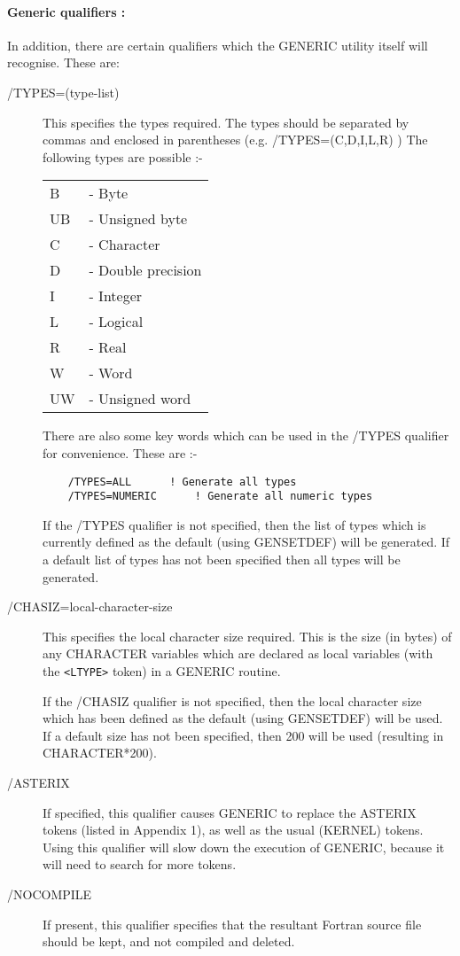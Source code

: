 \paragraph{Generic qualifiers :}
In addition, there are certain qualifiers which the
GENERIC utility itself will recognise. These are:

\begin{description}
\begin{description}
\item[/TYPES=(type-list)]
This specifies the types required. The types should be separated
by commas and enclosed in parentheses (e.g. /TYPES=(C,D,I,L,R) )
The following types are possible :-
\begin{center}
\begin{tabular}{ll}
	B  &- Byte \\
	UB &- Unsigned byte \\
	C  &- Character \\
	D  &- Double precision \\
	I  &- Integer \\
	L  &- Logical \\
	R  &- Real \\
	W  &- Word \\
	UW &- Unsigned word \\
\end{tabular}
\end{center}
There are also some key words which can be used in the /TYPES qualifier for 
convenience. These are :-
\begin{verbatim}
	/TYPES=ALL		! Generate all types
	/TYPES=NUMERIC		! Generate all numeric types
\end{verbatim}
If the /TYPES qualifier is not specified, then the list of types which
is currently defined as the default (using GENSETDEF) will be generated.
If a default list of types has not been specified then all types will be
generated. 

\item[/CHASIZ=local-character-size]
This specifies the local character size required.
This is the size (in bytes) of any CHARACTER variables which are
declared as local variables (with the \verb+<LTYPE>+ token) in a GENERIC
routine. 

If the /CHASIZ qualifier is not specified, then the local
character size which has been defined as the default (using GENSETDEF)
will be used.
If a default size has not been specified, then 200 will be used
(resulting in CHARACTER*200).

\item[/ASTERIX]
If specified, this qualifier causes GENERIC
to replace the ASTERIX tokens (listed in Appendix 1),
as well as the usual (KERNEL) tokens.
Using this qualifier will slow down the execution of GENERIC,
because it will need to search for more tokens.

\item[/NOCOMPILE]
If present, this qualifier specifies that the resultant
Fortran source file should be kept, and not compiled and deleted.

\end{description}
\end{description}

